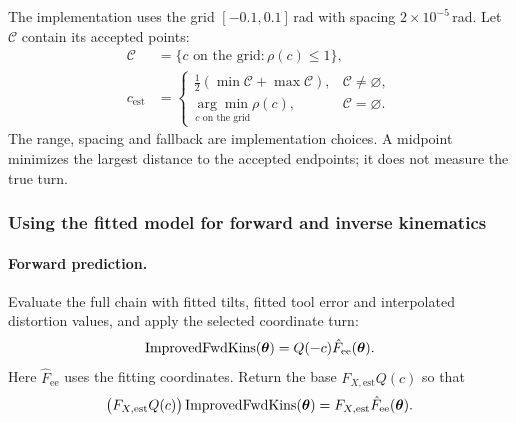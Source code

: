 \documentclass[../main.tex]{subfiles}
\begin{document}
The implementation uses the grid $[-0.1,0.1]$\,rad with spacing $2\times10^{-5}$\,rad. Let $\mathcal C$ contain its accepted points:
\begin{equation*}
\begin{aligned}
\mathcal C&=\{c\text{ on the grid}:\rho(c)\leq1\},\\
c_{\mathrm{est}}&=\begin{cases}
\tfrac12(\min\mathcal C+\max\mathcal C),&\mathcal C\ne\varnothing,\\
\underset{c\text{ on the grid}}{\arg\min}\rho(c),&\mathcal C=\varnothing.
\end{cases}
\end{aligned}
\end{equation*}
The range, spacing and fallback are implementation choices. A midpoint minimizes the largest distance to the accepted endpoints; it does not measure the true turn.

\subsubsection{Using the fitted model for forward and inverse kinematics}\label{sec:math-kinematics}
\paragraph{Forward prediction.}
Evaluate the full chain with fitted tilts, fitted tool error and interpolated distortion values, and apply the selected coordinate turn:
\begin{equation*}
\operatorname{ImprovedFwdKins}(\bm{\theta})=Q(-c)\hat F_{\mathrm{ee}}(\bm{\theta}).
\end{equation*}
Here $\hat F_{\mathrm{ee}}$ uses the fitting coordinates. Return the base $F_{X,\mathrm{est}}Q(c)$ so that
\begin{equation*}
\bigl(F_{X,\mathrm{est}}Q(c)\bigr)\operatorname{ImprovedFwdKins}(\bm{\theta})
=F_{X,\mathrm{est}}\hat F_{\mathrm{ee}}(\bm{\theta}).
\end{equation*}
\end{document}
